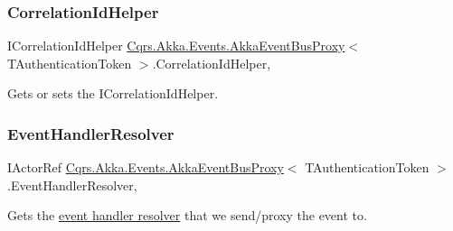 \subsubsection{\texorpdfstring{Correlation\+Id\+Helper}{CorrelationIdHelper}}
{\footnotesize\ttfamily I\+Correlation\+Id\+Helper \hyperlink{classCqrs_1_1Akka_1_1Events_1_1AkkaEventBusProxy}{Cqrs.\+Akka.\+Events.\+Akka\+Event\+Bus\+Proxy}$<$ T\+Authentication\+Token $>$.Correlation\+Id\+Helper\hspace{0.3cm}{\ttfamily [get]}, {\ttfamily [protected]}}



Gets or sets the I\+Correlation\+Id\+Helper. 

\mbox{\label{classCqrs_1_1Akka_1_1Events_1_1AkkaEventBusProxy_abd36f5db7a03a38d573b11c0d6f37117_abd36f5db7a03a38d573b11c0d6f37117}} 
\subsubsection{\texorpdfstring{Event\+Handler\+Resolver}{EventHandlerResolver}}
{\footnotesize\ttfamily I\+Actor\+Ref \hyperlink{classCqrs_1_1Akka_1_1Events_1_1AkkaEventBusProxy}{Cqrs.\+Akka.\+Events.\+Akka\+Event\+Bus\+Proxy}$<$ T\+Authentication\+Token $>$.Event\+Handler\+Resolver\hspace{0.3cm}{\ttfamily [get]}, {\ttfamily [protected]}}



Gets the \hyperlink{}{event handler resolver} that we send/proxy the event to. 

